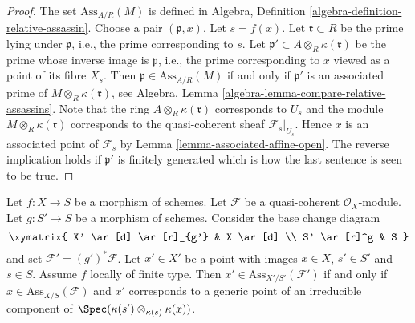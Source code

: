 \begin{proof}
The set $\text{Ass}_{A/R}(M)$ is defined in
Algebra, Definition \ref{algebra-definition-relative-assassin}.
Choose a pair $(\mathfrak p, x)$. Let $s = f(x)$.
Let $\mathfrak r \subset R$ be the prime lying under $\mathfrak p$,
i.e., the prime corresponding to $s$.
Let $\mathfrak p' \subset A \otimes_R \kappa(\mathfrak r)$
be the prime whose inverse image is $\mathfrak p$, i.e.,
the prime corresponding to $x$ viewed as a point of its fibre $X_s$.
Then $\mathfrak p \in \text{Ass}_{A/R}(M)$ if and only if
$\mathfrak p'$ is an associated prime of
$M \otimes_R \kappa(\mathfrak r)$, see
Algebra, Lemma \ref{algebra-lemma-compare-relative-assassins}.
Note that the ring $A \otimes_R \kappa(\mathfrak r)$ corresponds to $U_s$
and the module $M \otimes_R \kappa(\mathfrak r)$ corresponds to the
quasi-coherent sheaf $\mathcal{F}_s|_{U_s}$.
Hence $x$ is an associated point of $\mathcal{F}_s$
by Lemma \ref{lemma-associated-affine-open}.
The reverse implication holds if $\mathfrak p'$ is finitely generated
which is how the last sentence is seen to be true.
\end{proof}

\begin{lemma}
\label{lemma-base-change-relative-assassin}
Let $f : X \to S$ be a morphism of schemes.
Let $\mathcal{F}$ be a quasi-coherent $\mathcal{O}_X$-module.
Let $g : S' \to S$ be a morphism of schemes.
Consider the base change diagram
$$
\xymatrix{
X' \ar[d] \ar[r]_{g'} & X \ar[d] \\
S' \ar[r]^g & S
}
$$
and set $\mathcal{F}' = (g')^*\mathcal{F}$. Let $x' \in X'$ be a point
with images $x \in X$, $s' \in S'$ and $s \in S$.
Assume $f$ locally of finite type.
Then $x' \in \text{Ass}_{X'/S'}(\mathcal{F}')$ if and only if
$x \in \text{Ass}_{X/S}(\mathcal{F})$ and $x'$ corresponds to
a generic point of an irreducible component of
$\Spec(\kappa(s') \otimes_{\kappa(s)} \kappa(x))$.
\end{lemma}

